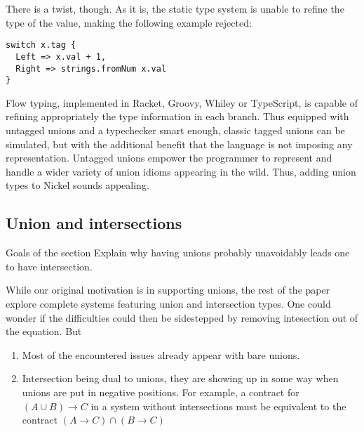 \documentclass[sigplan,10pt,review,anonymous]{acmart}
\newcommand{\unsure}[2][1=]{}
\begin{document}
There is a twist, though. As it is, the static type system is unable to refine
the type of the value, making the following example rejected:

\begin{lstlisting}
switch x.tag {
  Left => x.val + 1,
  Right => strings.fromNum x.val
}
\end{lstlisting}

Flow typing, implemented in Racket\cite{FlowTypingRacket1, FlowTypingRacket2},
Groovy\cite{FlowTypingGroovy}, Whiley\cite{FlowTypingWhiley} or
TypeScript\cite{FlowTypingTypeScript}, is capable of refining appropriately the
type information in each branch. Thus equipped with untagged unions and a
typechecker smart enough, classic tagged unions can be simulated, but with the
additional benefit that the language is not imposing any representation.
Untagged unions empower the programmer to represent and handle a wider variety
of union idioms appearing in the wild.  Thus, adding union types to Nickel
sounds appealing.

\subsection{Union and intersections}
{\color{red}Goals of the section
Explain why having unions probably unavoidably leads one to have intersection.\vspace{0.5cm}}

While our original motivation is in supporting unions, the rest of the paper
explore complete systems featuring union and intersection types. One could
wonder if the difficulties could then be sidestepped by removing intesection out
of the equation. But

\begin{enumerate}
    \item Most of the encountered issues already appear with bare unions.
    \item Intersection being dual to unions, they are showing up in some way
        when unions are put in negative positions. For example, a contract for
        $(A \cup B) \to C$ in a system without intersections must be
        equivalent\unsure{``Must be'' is a rather strong statement, we
        will find a way to tone it down}
        to the contract $(A \to C) \cap (B \to C)$
\end{enumerate}

\unsure{Some bits missing so far: we are interested in higher-order
  contracts, Nickel is a higher-order \& pure language, contracts as
  functions. We've said that user-defined contracts are a thing, it
  probably matters so we may have to hammer it down.}
\end{document}
